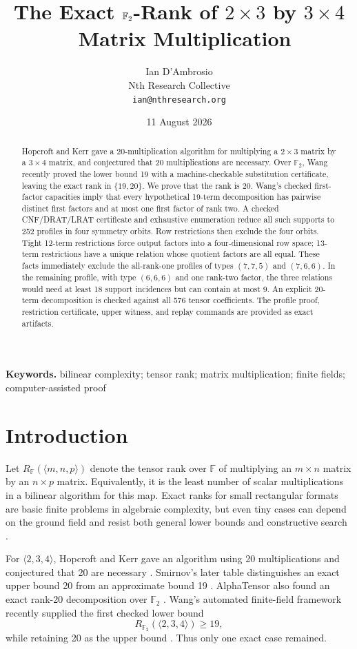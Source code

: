 \documentclass[10pt]{article}
\title{The Exact $\F_2$-Rank of $2\times3$ by $3\times4$\
Matrix Multiplication}
\author{Ian D'Ambrosio\\
\small Nth Research Collective\\
\small \texttt{ian@nthresearch.org}}
\date{11 August 2026}
\theoremstyle{remark}
\newcommand{\F}{\mathbb F}
\begin{document}
\maketitle

\begin{abstract}
Hopcroft and Kerr gave a 20-multiplication algorithm for multiplying a
$2\times3$ matrix by a $3\times4$ matrix, and conjectured that 20
multiplications are necessary.  Over $\F_2$, Wang recently proved the lower
bound 19 with a machine-checkable substitution certificate, leaving the exact
rank in $\{19,20\}$.  We prove that the rank is 20.  Wang's checked
first-factor capacities imply that every hypothetical 19-term decomposition
has pairwise distinct first factors and at most one first factor of rank two.  A
checked CNF/DRAT/LRAT certificate and exhaustive enumeration reduce all such
supports to 252 profiles in four symmetry orbits.  Row restrictions then
exclude the four orbits.  Tight 12-term restrictions force output factors into
a four-dimensional row space; 13-term restrictions have a unique relation
whose quotient factors are all equal.  These facts immediately exclude the
all-rank-one profiles of types $(7,7,5)$ and $(7,6,6)$.  In the remaining
profile, with type $(6,6,6)$ and one rank-two factor, the three relations would
need at least 18 support incidences but can contain at most 9.  An explicit
20-term decomposition is checked against all 576 tensor coefficients.  The
profile proof, restriction certificate, upper witness, and replay commands are
provided as exact artifacts.
\end{abstract}

\noindent\textbf{Keywords.}
bilinear complexity; tensor rank; matrix multiplication; finite fields;
computer-assisted proof

\section{Introduction}

Let $R_{\F}(\langle m,n,p\rangle)$ denote the tensor rank over $\F$ of
multiplying an $m\times n$ matrix by an $n\times p$ matrix.  Equivalently, it
is the least number of scalar multiplications in a bilinear algorithm for this
map.  Exact ranks for small rectangular formats are basic finite problems in
algebraic complexity, but even tiny cases can depend on the ground field and
resist both general lower bounds and constructive search
\cite{Blaser2003,Smirnov2013}.

For $\langle2,3,4\rangle$, Hopcroft and Kerr gave an algorithm using 20
multiplications and conjectured that 20 are necessary
\cite{HopcroftKerr1971}.  Smirnov's later table distinguishes an exact upper
bound 20 from an approximate bound 19 \cite{Smirnov2013}.  AlphaTensor also
found an exact rank-20 decomposition over $\F_2$ \cite{FawziEtAl2022}.
Wang's automated finite-field framework recently supplied the first checked
lower bound
\[
 R_{\F_2}(\langle2,3,4\rangle)\geq19,
\]
while retaining 20 as the upper bound \cite{Wang2026}.  Thus only one exact
case remained.
\end{document}
